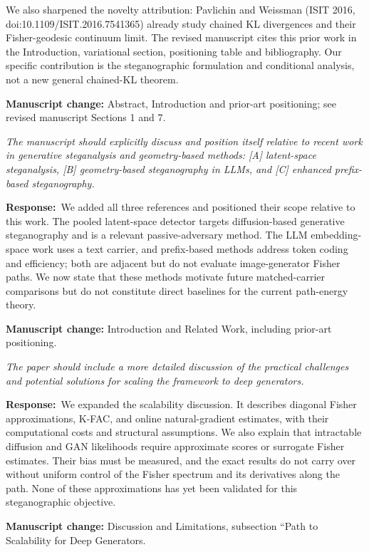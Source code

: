 \documentclass[12pt,a4paper]{article}
\newcommand{\revcomment}[1]{\par\medskip\noindent\colorbox{gray!15}{\parbox{\dimexpr\linewidth-2\fboxsep}{\itshape #1}}\par\medskip}
\newcommand{\ourresponse}{\noindent\textbf{Response:}\ }
\newcommand{\manuscriptchange}[1]{\par\smallskip\noindent\textcolor{blue!70!black}{\textbf{Manuscript change:} #1}\par\smallskip}
\begin{document}
We also sharpened the novelty attribution: Pavlichin and Weissman
(ISIT 2016, doi:10.1109/ISIT.2016.7541365) already study chained KL
divergences and their Fisher-geodesic continuum limit. The revised
manuscript cites this prior work in the Introduction, variational
section, positioning table and bibliography. Our specific contribution
is the steganographic formulation and conditional analysis, not a new
general chained-KL theorem.

\manuscriptchange{Abstract, Introduction and prior-art positioning; see revised manuscript Sections 1 and 7.}

\revcomment{The manuscript should explicitly discuss and position itself relative to recent work in generative steganalysis and geometry-based methods: [A] latent-space steganalysis, [B] geometry-based steganography in LLMs, and [C] enhanced prefix-based steganography.}

\ourresponse We added all three references and positioned their scope relative to this work. The pooled latent-space detector targets diffusion-based generative steganography and is a relevant passive-adversary method. The LLM embedding-space work uses a text carrier, and prefix-based methods address token coding and efficiency; both are adjacent but do not evaluate image-generator Fisher paths. We now state that these methods motivate future matched-carrier comparisons but do not constitute direct baselines for the current path-energy theory.

\manuscriptchange{Introduction and Related Work, including prior-art positioning.}

\revcomment{The paper should include a more detailed discussion of the practical challenges and potential solutions for scaling the framework to deep generators.}

\ourresponse We expanded the scalability discussion. It describes diagonal Fisher approximations, K-FAC, and online natural-gradient estimates, with their computational costs and structural assumptions. We also explain that intractable diffusion and GAN likelihoods require approximate scores or surrogate Fisher estimates. Their bias must be measured, and the exact results do not carry over without uniform control of the Fisher spectrum and its derivatives along the path. None of these approximations has yet been validated for this steganographic objective.

\manuscriptchange{Discussion and Limitations, subsection ``Path to Scalability for Deep Generators.}
\end{document}

